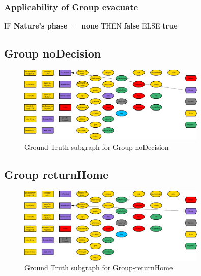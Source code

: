 \documentclass{article}%
\begin{document}
%
\subsubsection{Applicability of Group evacuate}%
\label{ssubsec:Applicability of Group evacuate}%
\begin{flushleft}%
IF %
\textbf{Nature's phase}%
$=$%
\textbf{none}%
\linebreak%
\hspace*{2em}%
THEN %
\textbf{false}%
\linebreak%
\hspace*{2em}%
ELSE %
\textbf{true}%
\end{flushleft}

%
\subsection{Group noDecision}%
\label{subsec:Group noDecision}%


\begin{figure}[ht]%
\centering%
\includegraphics[width=0.8\textwidth]{images/Group-noDecision.png}%
\caption{Ground Truth subgraph for Group{-}noDecision}%
\end{figure}

%
\subsection{Group returnHome}%
\label{subsec:Group returnHome}%


\begin{figure}[ht]%
\centering%
\includegraphics[width=0.8\textwidth]{images/Group-returnHome.png}%
\caption{Ground Truth subgraph for Group{-}returnHome}%
\end{figure}
\end{document}
